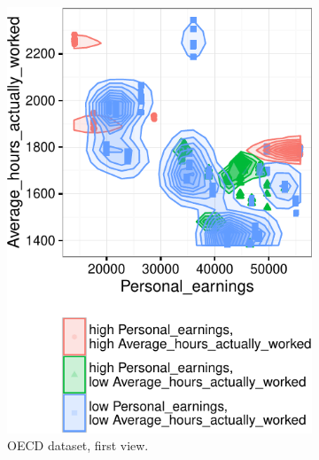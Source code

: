 \begin{figure}[t!]
    \centering
    \begin{subfigure}[b]{0.48\columnwidth}
        \includegraphics[width=\textwidth]{Experiments/CaseValidation1}
        \caption{OECD dataset, first view.}
        \label{fig:validation1}
    \end{subfigure}
    ~
    \begin{subfigure}[b]{0.48\columnwidth}

\end{subfigure}
\end{figure}
